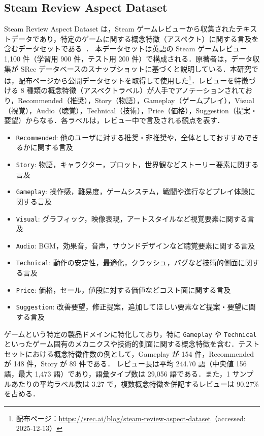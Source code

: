 \subsection{Steam Review Aspect Dataset}
Steam Review Aspect Dataset は，Steam ゲームレビューから収集されたテキストデータであり，特定のゲームに関する概念特徴（アスペクト）に関する言及を含むデータセットである~\cite{srec:steam-review-aspect-dataset}．
本データセットは英語の Steam ゲームレビュー 1,100 件（学習用 900 件，テスト用 200 件）で構成される．原著者は，データ収集が SRec データベースのスナップショットに基づくと説明している．本研究では，配布ページから公開データセットを取得して使用した\footnote{配布ページ：\url{https://srec.ai/blog/steam-review-aspect-dataset}（accessed: 2025-12-13）}．レビューを特徴づける 8 種類の概念特徴（アスペクトラベル）が人手でアノテーションされており，Recommended（推奨），Story（物語），Gameplay（ゲームプレイ），Visual（視覚），Audio（聴覚），Technical（技術），Price（価格），Suggestion（提案・要望）からなる．各ラベルは，レビュー中で言及される観点を表す．
\begin{itemize}
  \item \texttt{Recommended}: 他のユーザに対する推奨・非推奨や，全体としておすすめできるかに関する言及
  \item \texttt{Story}: 物語，キャラクター，プロット，世界観などストーリー要素に関する言及
  \item \texttt{Gameplay}: 操作感，難易度，ゲームシステム，戦闘や進行などプレイ体験に関する言及
  \item \texttt{Visual}: グラフィック，映像表現，アートスタイルなど視覚要素に関する言及
  \item \texttt{Audio}: BGM，効果音，音声，サウンドデザインなど聴覚要素に関する言及
  \item \texttt{Technical}: 動作の安定性，最適化，クラッシュ，バグなど技術的側面に関する言及
  \item \texttt{Price}: 価格，セール，値段に対する価値などコスト面に関する言及
  \item \texttt{Suggestion}: 改善要望，修正提案，追加してほしい要素など提案・要望に関する言及
\end{itemize}
ゲームという特定の製品ドメインに特化しており，特に \texttt{Gameplay} や \texttt{Technical} といったゲーム固有のメカニクスや技術的側面に関する概念特徴を含む．テストセットにおける概念特徴件数の例として，Gameplay が 154 件，Recommended が 148 件，Story が 89 件である．
レビュー長は平均 244.70 語（中央値 156 語，最大 1,473 語）であり，語彙タイプ数は 29,056 語である．また，1 サンプルあたりの平均ラベル数は 3.27 で，複数概念特徴を併記するレビューは 90.27\% を占める．

